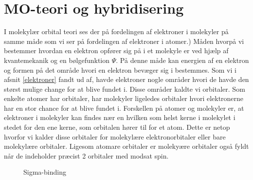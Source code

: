 \section{MO-teori og hybridisering}
I molekylær orbital teori ses der på fordelingen af elektroner i molekyler på samme måde som vi ser på fordelingen af elektroner i atomer.) Måden hvorpå vi bestemmer hvordan en elektron opfører sig på i et molekyle er ved hjælp af kvantemekanik og en bølgefunktion $\Psi$. På denne måde kan energien af en elektron og formen på det område hvori en elektron bevæger sig i bestemmes. Som vi i afsnit \ref{elektroner} fandt ud af, havde elektroner nogle områder hvori de havde den størst mulige change for at blive fundet i. Disse områder kaldte vi orbitaler. Som enkelte atomer har orbitaler, har molekyler ligeledes orbitaler hvori elektronerne har en stor chance for at blive fundet i. Forskellen på atomer og molekyler er, at elektroner i molekyler kan findes nær en hvilken som helst kerne i molekylet i stedet for den ene kerne, som orbitalen hører til for et atom. Dette er netop hvorfor vi kalder disse orbitaler for molekylære elektronorbitaler eller bare molekylære orbitaler. Ligesom atomare orbitaler er molekyære orbitaler også fyldt når de indeholder præcist 2 orbitaler med modsat spin. 
\\

\begin{wrapfigure}{r}{0.55\textwidth}
  \centering
  \caption{Sigma-binding \label{fig:sigmabinding}}
   \end{wrapfigure}

